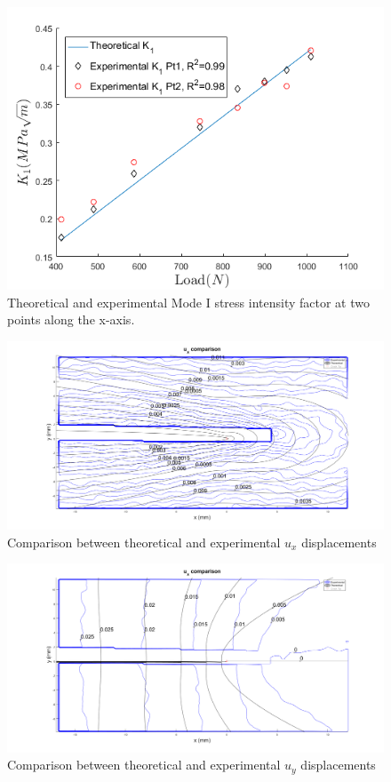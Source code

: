 \documentclass[12pt]{article}
\begin{document}
\begin{figure}[H]
	\begin{center}
		
		\includegraphics[width=1\textwidth]{K_1_Comparisons.png}
		\caption{Theoretical and experimental Mode I stress intensity factor at two points along the x-axis.}
		\label{fig:K1}
	\end{center}
\end{figure}

\begin{figure}[H]
	\centering
	\includegraphics[width=1\textwidth]{cc_x.png}
	\caption{Comparison between theoretical and experimental $u_{x}$ displacements}
	\label{fig:cc1}
\end{figure}

\begin{figure}[H]
	\centering
	\includegraphics[width=1\textwidth]{cc_y.png}
	\caption{Comparison between theoretical and experimental $u_{y}$ displacements}
	\label{fig:cc2}
\end{figure}
\end{document}
